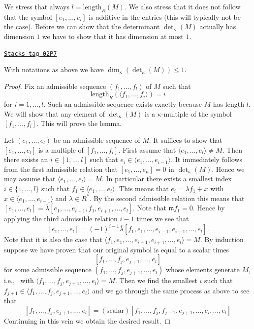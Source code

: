 We stress that always $l = \text{length}_R(M)$. We also stress that
it does not follow that the symbol $[e_1, \ldots, e_l]$ is
additive in the entries (this will typically not be the case).
Before we can show that the determinant $\det_\kappa(M)$ actually
has dimension $1$ we have to show that it has dimension at most $1$.

\begin{lemma}
\label{chow-lemma-dimension-at-most-one}
\href{https://stacks.math.columbia.edu/tag/02P7}{\texttt{Stacks tag 02P7}}

With notations as above we have $\dim_\kappa(\det_\kappa(M)) \leq 1$.
\end{lemma}

\begin{proof}
Fix an admissible sequence $(f_1, \ldots, f_l)$ of $M$ such that
$$
\text{length}_R(\langle f_1, \ldots, f_i\rangle) = i
$$
for $i = 1, \ldots, l$. Such an admissible sequence exists exactly because
$M$ has length $l$. We will show that any element of
$\det_\kappa(M)$ is a $\kappa$-multiple of the symbol
$[f_1, \ldots, f_l]$. This will prove the lemma.

\medskip\noindent
Let $(e_1, \ldots, e_l)$ be an admissible sequence of $M$.
It suffices to show that $[e_1, \ldots, e_l]$ is a multiple
of $[f_1, \ldots, f_l]$. First assume that
$\langle e_1, \ldots, e_l\rangle \not = M$. Then there exists
an $i \in [1, \ldots, l]$ such that
$e_i \in \langle e_1, \ldots, e_{i - 1}\rangle$. It immediately
follows from the first admissible relation that
$[e_1, \ldots, e_n] = 0$ in $\det_\kappa(M)$.
Hence we may assume that $\langle e_1, \ldots, e_l\rangle = M$.
In particular there exists a smallest index $i \in \{1, \ldots, l\}$
such that $f_1 \in \langle e_1, \ldots, e_i\rangle$. This means
that $e_i = \lambda f_1 + x$ with
$x \in \langle e_1, \ldots, e_{i - 1}\rangle$ and $\lambda \in R^*$.
By the second admissible relation this means that
$[e_1, \ldots, e_l] =
\overline{\lambda}[e_1, \ldots, e_{i - 1}, f_1, e_{i + 1}, \ldots, e_l]$.
Note that $\mathfrak m f_1 = 0$. Hence by applying the third
admissible relation $i - 1$ times we see that
$$
[e_1, \ldots, e_l] =
(-1)^{i - 1}\overline{\lambda}
[f_1, e_1, \ldots, e_{i - 1}, e_{i + 1}, \ldots, e_l].
$$
Note that it is also the case that
$ \langle f_1, e_1, \ldots, e_{i - 1}, e_{i + 1}, \ldots, e_l\rangle = M$.
By induction suppose we have proven that our original
symbol is equal to a scalar times
$$
[f_1, \ldots, f_j, e_{j + 1}, \ldots, e_l]
$$
for some admissible sequence $(f_1, \ldots, f_j, e_{j + 1}, \ldots, e_l)$
whose elements generate $M$, i.e., \ with
$\langle f_1, \ldots, f_j, e_{j + 1}, \ldots, e_l\rangle = M$.
Then we find the smallest $i$ such that
$f_{j + 1} \in \langle f_1, \ldots, f_j, e_{j + 1}, \ldots, e_i\rangle$
and we go through the same process as above to see that
$$
[f_1, \ldots, f_j, e_{j + 1}, \ldots, e_l]
=
(\text{scalar}) [f_1, \ldots, f_j, f_{j + 1}, e_{j + 1},
\ldots, \hat{e_i}, \ldots, e_l]
$$
Continuing in this vein we obtain the desired result.
\end{proof}


